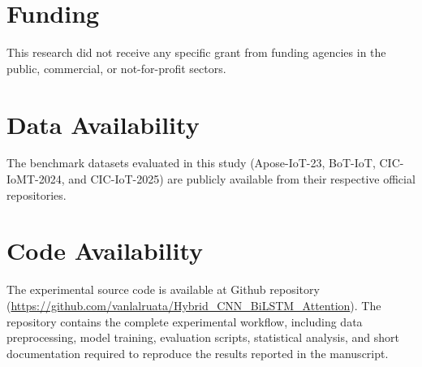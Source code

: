 \documentclass[12pt,a4paper]{article}
\begin{document}
\section*{Funding}
This research did not receive any specific grant from funding agencies in the public, commercial, or not-for-profit sectors.

\section*{Data Availability}
The benchmark datasets evaluated in this study (Apose-IoT-23, BoT-IoT, CIC-IoMT-2024, and CIC-IoT-2025) are publicly available from their respective official repositories.

\section*{Code Availability}
The experimental source code is available at Github repository (\href{https://github.com/vanlalruata/Hybrid\_CNN\_BiLSTM\_Attention}{https://github.com/vanlalruata/Hybrid\_CNN\_BiLSTM\_Attention}). The repository contains the complete experimental workflow, including data preprocessing, model training, evaluation scripts, statistical analysis, and short documentation required to reproduce the results reported in the manuscript.
\end{document}
